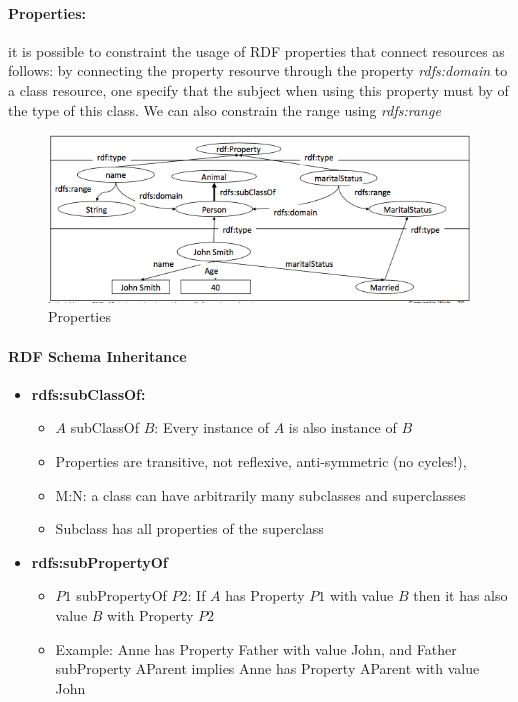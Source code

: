\paragraph{Properties:} it is possible to constraint the usage of RDF properties that connect resources as follows: by connecting the property resourve through the property \textit{rdfs:domain} to a class resource, one specify that the subject when using this property must by of the type of this class. We can also constrain the range using \textit{rdfs:range}

\begin{figure}[H]
\begin{center}
\includegraphics[width=1\linewidth]{figures/properties.png}
\end{center}
\caption{Properties}
\label{fig:class}
\end{figure}

\paragraph{RDF Schema Inheritance} 
\begin{itemize}
	\item \bf{rdfs:subClassOf:}
		\begin{itemize}
			\item $A$ subClassOf $B$: Every instance of $A$ is also instance of $B$
			\item Properties are transitive, not reflexive, anti-symmetric (no cycles!),
			\item M:N: a class can have arbitrarily many subclasses and superclasses
			\item Subclass has all properties of the superclass		
		\end{itemize}
	\item \bf{rdfs:subPropertyOf}
		\begin{itemize}
			\item $P1$ subPropertyOf $P2$: If $A$ has Property $P1$ with value $B$ then it has also value $B$ with Property $P2$
			\item Example: Anne has Property Father with value John, and Father subProperty AParent implies Anne has Property AParent with value John
		\end{itemize}
\end{itemize}

